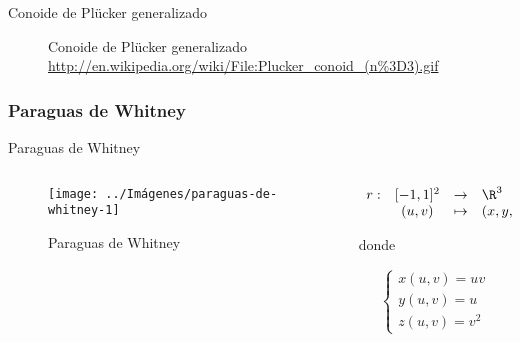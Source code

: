 \documentclass[10pt]{beamer}
\begin{document}
	\begin{frame}{Conoide de Plücker generalizado}
	
		
		\begin{figure}
				\centering
				\caption{Conoide de Plücker generalizado \url{http://en.wikipedia.org/wiki/File:Plucker_conoid_(n\%3D3).gif}}
				\label{fig:conoide-de-Plücker-generalizado-gif}
		\end{figure}
	\end{frame}
	
	\subsubsection{Paraguas de Whitney}
	
	\begin{frame}{Paraguas de Whitney}
		\begin{columns}[t] %
			\begin{column}{.50\textwidth}
				\begin{figure}
					\centering
					\texttt{[image: ../Imágenes/paraguas-de-whitney-1]}
					\caption{Paraguas de Whitney}
					\label{fig:paraguas-de-Whitney-1}
				\end{figure}
			\end{column}%
			\hfill%
			\begin{column}{.50\textwidth}
				$$\begin{array}{rcll}
				r : & [-1, 1]^2 & \to & \R^3\\
				& (u,v) & \mapsto & (x,y,z)
				\end{array}$$
				
				donde 
				
				$$ \begin{cases}
				x(u,v) = uv \\
				y(u,v) = u \\
				z(u,v) = v^2
				\end{cases} $$
			\end{column}%
		\end{columns}
	\end{frame}
	
\end{document}
